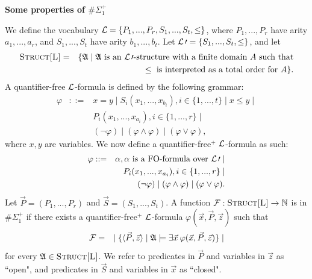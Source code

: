 \documentclass[12pt]{article}
\def\A{{\frak A}}
\def\L{{\cal L}}
\def\F{{\cal F}}
\def\P{\vec{P}}
\def\S{\vec{S}}
\def\x{\vec{x}}
\def\z{\vec{z}}
\begin{document}
\begin{center}
{ \LARGE \bf
  Some properties of $\#\Sigma_1^{+}$
}
\end{center}

We define the vocabulary $\L = \{ P_1, ..., P_r, S_1,...,S_t, \leq \}$, where $P_1, ..., P_r$ have arity $a_1,...,a_r$, and $S_1,...,S_t$ have arity $b_1,...,b_t$. Let $\L\prime = \{ S_1,...,S_t, \leq \}$, and let
\begin{eqnarray*}
\textsc{Struct[\L]} &=& \{\A \mid \A \text{ is an } \L\prime \text{-structure with a finite domain } A \text{ such that} \\
&& \leq \text{ is interpreted as a total order for } A \}.
\end{eqnarray*}
A quantifier-free $\L$-formula is defined by the following grammar:
\begin{eqnarray*}
\varphi &::=& x = y \mid S_i(x_1,...,x_{b_i}), i \in \{1,...,t\} \mid x \leq y \mid \\
&& P_i(x_1,...,x_{a_i}), i \in \{1,...,r\} \mid \\ 
&& (\neg \varphi) \mid (\varphi \wedge \varphi) \mid (\varphi \vee \varphi),
\end{eqnarray*}
where $x, y$ are variables. We now define a quantifier-free$^{+}$ $\L$-formula as such:
\begin{eqnarray*}
\varphi &::=& \alpha, \alpha \text{ is a FO-formula over } \L\prime  \mid \\
&& P_i(x_1,...,x_{a_i}), i \in \{1,...,r\} \mid \\
&& (\neg \varphi) \mid (\varphi \wedge \varphi) \mid (\varphi \vee \varphi).
\end{eqnarray*}
Let $\P = (P_1, ..., P_r)$ and $\S = (S_1,...,S_t)$. A function $\F:\textsc{Struct[\L]} \to \mathbb{N}$ is in $\#\Sigma_1^+$ if there exists a quantifier-free$^{+}$ $\L$-formula $\varphi(\x,\P,\z)$ such that
\begin{eqnarray*}
\F &=& \mid \{ \langle \P, \z \rangle \mid \A \models \exists \x \: \varphi(\x,\P,\z) \} \mid
\end{eqnarray*}
for every $\A \in \textsc{Struct[\L]}$. We refer to predicates in $\P$ and variables in $\z$ as ``open", and predicates in $\S$ and variables in $\x$ as ``closed".
\end{document}
